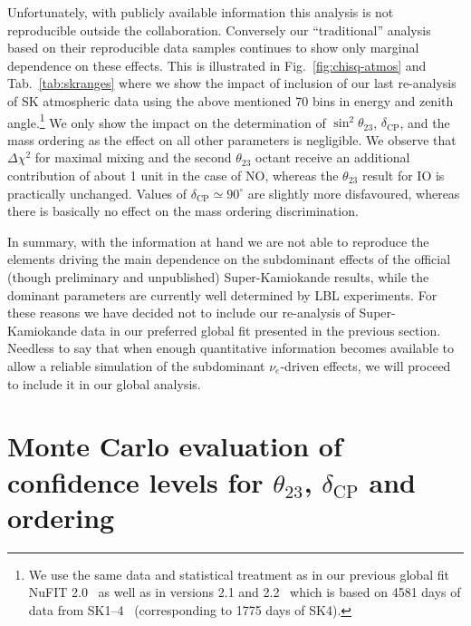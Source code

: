\documentclass[a4paper, 11pt]{article}
\begin{document}
Unfortunately, with publicly available information this analysis is
not reproducible outside the collaboration.  Conversely our
``traditional'' analysis based on their reproducible data samples
continues to show only marginal dependence on these effects. This is
illustrated in Fig.~\ref{fig:chisq-atmos} and Tab.~\ref{tab:skranges}
where we show the impact of inclusion of our last re-analysis of SK
atmospheric data using the above mentioned 70 bins in energy and
zenith angle.\footnote{We use the same data and statistical treatment
  as in our previous global fit
  NuFIT 2.0~\cite{Gonzalez-Garcia:2014bfa} as well as in versions 2.1
  and 2.2~\cite{nufit} which is based on 4581 days of data from
  SK1--4~\cite{Wendell:2014dka} (corresponding to 1775 days of SK4).}
We only show the impact on the determination of $\sin^2\theta_{23}$,
$\delta_\text{CP}$, and the mass ordering as the effect on all other
parameters is negligible. We observe that $\Delta\chi^2$ for maximal
mixing and the second $\theta_{23}$ octant receive an additional
contribution of about 1 unit in the case of NO, whereas the
$\theta_{23}$ result for IO is practically unchanged. Values of
$\delta_\text{CP} \simeq 90^\circ$ are slightly more disfavoured,
whereas there is basically no effect on the mass ordering
discrimination.

In summary, with the information at hand we are not able to reproduce
the elements driving the main dependence on the subdominant effects of
the official (though preliminary and unpublished) Super-Kamiokande
results, while the dominant parameters are currently well determined
by LBL experiments. For these reasons we have decided not to include
our re-analysis of Super-Kamiokande data in our preferred global fit
presented in the previous section.  Needless to say that when enough
quantitative information becomes available to allow a reliable
simulation of the subdominant $\nu_e$-driven effects, we will proceed
to include it in our global analysis.

\section{Monte Carlo evaluation of confidence levels  for $\theta_{23}$,
 $\delta_\text{CP}$ and ordering}
\label{sec:MC}
\end{document}
